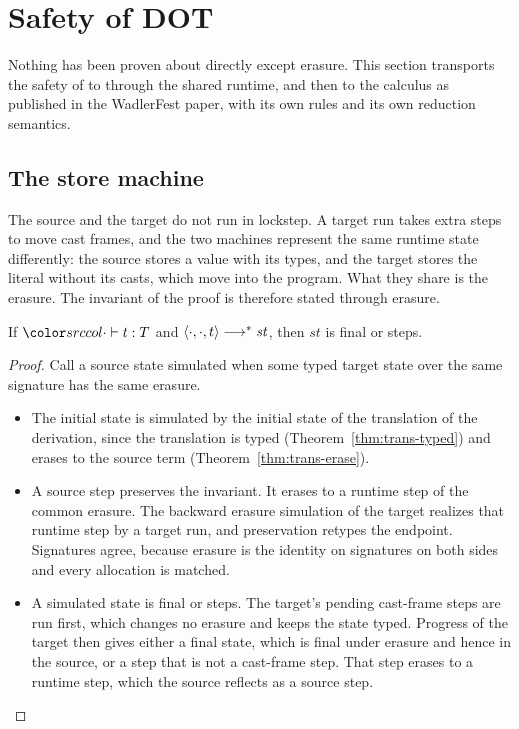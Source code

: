 \mathsrc
\section{Safety of DOT}\label{sec:safety}

Nothing has been proven about \DOTMNF directly except erasure. This section transports the safety of \FCdot to \DOTMNF through the shared runtime, and then to the calculus as published in the WadlerFest paper, with its own rules and its own reduction semantics.

\subsection{The store machine}

The source and the target do not run in lockstep. A target run takes extra steps to move cast frames, and the two machines represent the same runtime state differently: the source stores a value with its types, and the target stores the literal without its casts, which move into the program. What they share is the erasure. The invariant of the proof is therefore stated through erasure.

\begin{theorem}\label{thm:dot-safety}
If $\dtyj{\cdot}{t}{T}$ and $\langle \cdot, \cdot, t\rangle \longrightarrow^{*} \mathit{st}$, then $\mathit{st}$ is final or steps.
\end{theorem}

\begin{proof}
Call a source state simulated when some typed target state over the same signature has the same erasure.
\begin{itemize}
\item The initial state is simulated by the initial state of the translation of the derivation, since the translation is typed (Theorem~\ref{thm:trans-typed}) and erases to the source term (Theorem~\ref{thm:trans-erase}).
\item A source step preserves the invariant. It erases to a runtime step of the common erasure. The backward erasure simulation of the target realizes that runtime step by a target run, and preservation retypes the endpoint. Signatures agree, because erasure is the identity on signatures on both sides and every allocation is matched.
\item A simulated state is final or steps. The target's pending cast-frame steps are run first, which changes no erasure and keeps the state typed. Progress of the target then gives either a final state, which is final under erasure and hence in the source, or a step that is not a cast-frame step. That step erases to a runtime step, which the source reflects as a source step. \qedhere
\end{itemize}
\end{proof}

